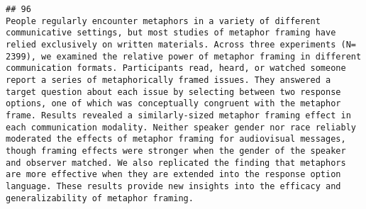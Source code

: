 \documentclass[
  english,
  man]{apa6}
\begin{document}
\begin{verbatim}
## 96                                                                                                                                                                                                                                                                                                                                                                                                                                                                                                                                                                                                                                                                                                                                                                                                                                                                                                                                                                                                                                                                                                                                                                                                                                                                                                                                                                                                                                                                                                                                                                               People regularly encounter metaphors in a variety of different communicative settings, but most studies of metaphor framing have relied exclusively on written materials. Across three experiments (N= 2399), we examined the relative power of metaphor framing in different communication formats. Participants read, heard, or watched someone report a series of metaphorically framed issues. They answered a target question about each issue by selecting between two response options, one of which was conceptually congruent with the metaphor frame. Results revealed a similarly-sized metaphor framing effect in each communication modality. Neither speaker gender nor race reliably moderated the effects of metaphor framing for audiovisual messages, though framing effects were stronger when the gender of the speaker and observer matched. We also replicated the finding that metaphors are more effective when they are extended into the response option language. These results provide new insights into the efficacy and generalizability of metaphor framing.

\end{verbatim}
\end{document}
